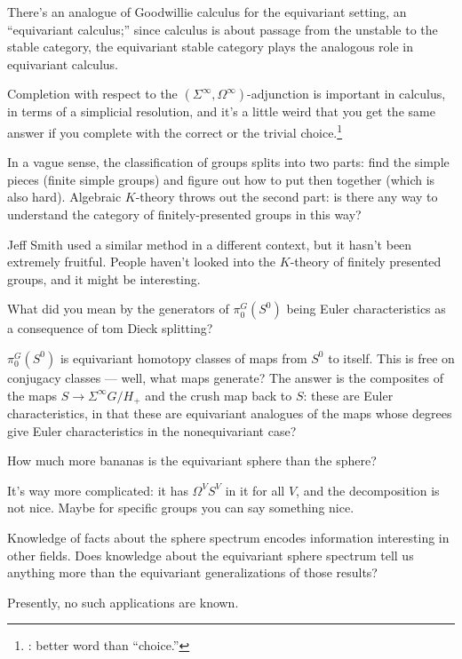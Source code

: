 There's an analogue of Goodwillie calculus for the equivariant setting, an ``equivariant calculus;'' since calculus
is about passage from the unstable to the stable category, the equivariant stable category plays the analogous role
in equivariant calculus.

Completion with respect to the $(\Sigma^\infty, \Omega^\infty)$-adjunction is important in calculus, in terms of a
simplicial resolution, and it's a little weird that you get the same answer if you complete with the correct or the
trivial choice.\footnote{\TODO: better word than ``choice.''}
\begin{ques}
In a vague sense, the classification of groups splits into two parts: find the simple pieces (finite simple
groups) and figure out how to put then together (which is also hard). Algebraic $K$-theory throws out the second
part: is there any way to understand the category of finitely-presented groups in this way?
\end{ques}
Jeff Smith used a similar method in a different context, but it hasn't been extremely fruitful. People haven't
looked into the $K$-theory of finitely presented groups, and it might be interesting.
\begin{ques}
What did you mean by the generators of $\pi_0^G(S^0)$ being Euler characteristics as a consequence of tom Dieck
splitting?
\end{ques}
$\pi_0^G(S^0)$ is equivariant homotopy classes of maps from $S^0$ to itself. This is free on conjugacy classes ---
well, what maps generate? The answer is the composites of the maps $S\to\Sigma^\infty G/H_+$ and the crush map back
to $S$: these are Euler characteristics, in that these are equivariant analogues of the maps whose degrees give
Euler characteristics in the nonequivariant case?
\begin{ques}
How much more bananas is the equivariant sphere than the sphere?
\end{ques}
It's way more complicated: it has $\Omega^V S^V$ in it for all $V$, and the decomposition is not nice. Maybe for
specific groups you can say something nice.
\begin{ques}
Knowledge of facts about the sphere spectrum encodes information interesting in other fields. Does knowledge about
the equivariant sphere spectrum tell us anything more than the equivariant generalizations of those results?
\end{ques}
Presently, no such applications are known.
